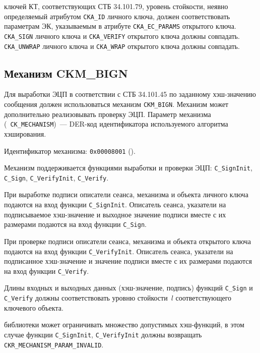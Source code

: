 ключей КТ, соответствующих СТБ 34.101.79,
уровень стойкости, неявно определяемый атрибутом \verb|CKA_ID| личного ключа,
должен соответствовать параметрам ЭК, указываемым в атрибуте \verb|CKA_EC_PARAMS| открытого ключа.  \verb|CKA_SIGN| личного ключа и \verb|CKA_VERIFY| открытого ключа должны совпадать.  \verb|CKA_UNWRAP| личного ключа и \verb|CKA_WRAP| открытого ключа должны совпадать.

\subsection{Механизм CKM\_BIGN}

Для выработки ЭЦП в соответствии с СТБ 34.101.45 по заданному хэш-значению 
сообщения должен использоваться механизм \verb|CKM_BIGN|. Механизм может 
дополнительно реализовывать проверку ЭЦП. 
%
Параметр механизма (~\verb|CK_MECHANISM|)~--- DER-код идентификатора используемого 
алгоритма хэширования.

Идентификатор механизма: \texttt{0x00008001} 
(). 

Механизм поддерживается функциями выработки и проверки ЭЦП: 
\verb|C_SignInit|, \verb|C_Sign|, \verb|C_VerifyInit|, \verb|C_Verify|.

При выработке подписи описатели сеанса, механизма и объекта
личного ключа подаются на вход функции \verb|C_SignInit|.
Описатель сеанса, указатели на подписываемое хэш-значение и выходное значение подписи
вместе с их размерами подаются на вход функции \verb|C_Sign|.

При проверке подписи описатели сеанса, механизма и объекта
открытого ключа подаются на вход функции \verb|C_VerifyInit|.
Описатель сеанса, указатели на подписанное хэш-значение и значение подписи
вместе с их размерами подаются на вход функции \verb|C_Verify|.

Длины входных и выходных данных (хэш-значение, подпись) функций
\verb|C_Sign| и \verb|C_Verify| должны соответствовать
уровню стойкости~$l$ соответствующего ключевого объекта.


 библиотеки может ограничивать множество
допустимых хэш-функций, в этом случае функции \verb|C_SignInit|,
\verb|C_VerifyInit| должны возвращать \verb|CKR_MECHANISM_PARAM_INVALID|.

